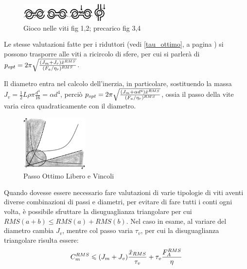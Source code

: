 \begin{figure}[h]
    \centering
    \includegraphics[width=0.4\textwidth]{Immagini/gioco_viti_ricircolo.png}
    \caption{Gioco nelle viti fig 1,2; precarico fig 3,4}
\end{figure}

Le stesse valutazioni fatte per i riduttori (vedi \ref{tau_ottimo}, a pagina \pageref{tau_ottimo}) si possono trasporre alle viti a ricircolo di sfere, per cui si parlerà di \(p_{opt}=2\pi \sqrt{\frac{(J_m+J_r)\Ddot{x}^{RMS}}{(F_a/\eta_r)^{RMS}}}\).

Il diametro entra nel calcolo dell'inerzia, in particolare, sostituendo la massa \(J_v=\frac{1}{2}L\rho \pi \frac{d^4}{16} = \alpha d^4\), perciò \(p_{opt}=2\pi \sqrt{\frac{(J_m+\alpha d^4)\Ddot{x}^{RMS}}{(F_a/\eta_r)^{RMS}}}\), ossia il passo della vite varia circa quadraticamente con il diametro.
\begin{figure}[h]
    \centering
    \includegraphics[width=0.3\textwidth]{Immagini/passo_ottimo_libero.png}
    \caption{Passo Ottimo Libero e Vincoli}
\end{figure}

Quando dovesse essere necessario fare valutazioni di varie tipologie di viti aventi diverse combinazioni di passi e diametri, per evitare di fare tutti i conti ogni volta, è possibile sfruttare la disuguaglianza triangolare per cui \(RMS(a+b) \leqslant RMS(a) + RMS(b) \). Nel caso in esame, al variare del diametro cambia \(J_v\), mentre col passo varia \(\tau_v\), per cui la disuguaglianza triangolare risulta essere:
\[ C_m^{RMS} \leqslant (J_m + J_v) \frac{\Ddot{x}_{RMS}}{\tau_v} + \tau_v \frac{F_A^{RMS}}{\eta} \]